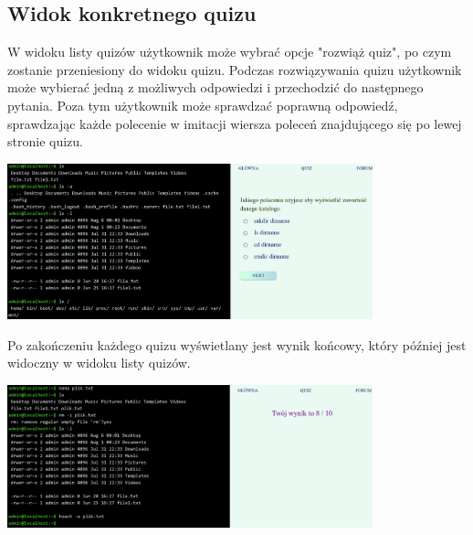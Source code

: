 \documentclass[10pt,a4paper]{report}
\begin{document}
\begin{adjustwidth}{2cm}{2cm}
\subsection{Widok konkretnego quizu}
\begin{minipage}{1\linewidth}
W widoku listy quizów użytkownik może wybrać opcje "rozwiąż quiz", po czym zostanie przeniesiony do widoku quizu. Podczas rozwiązywania quizu użytkownik może wybierać jedną z możliwych odpowiedzi i przechodzić do następnego pytania. Poza tym użytkownik może sprawdzać poprawną odpowiedź, sprawdzając każde polecenie w imitacji wiersza poleceń znajdującego się po lewej stronie quizu. \\
\end{minipage}
\begin{minipage}{\linewidth}
\begin{center}
  \includegraphics[width=400px]{project/quiz1.png}
\end{center}
\end{minipage}
\begin{minipage}{1\linewidth}
\vspace{0.3cm}
 Po zakończeniu każdego quizu wyświetlany jest wynik końcowy, który później jest widoczny w widoku listy quizów. \\
 \end{minipage}
\begin{minipage}{\linewidth}
\begin{center}
  \includegraphics[width=400px]{project/quiz2.png}
\end{center}
\end{minipage}


\end{adjustwidth}
\end{document}
